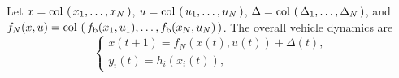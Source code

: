 \documentclass[letterpaper,journal]{IEEEtran}
\def\col#1{\mathop{{\rm col}\,\left(\,#1\,\right)}}
\begin{document}
Let $x=\col{x_1,\ldots,x_N}$, $u=\col{u_1,\ldots,u_N}$, $\Delta=\col{\Delta_1,\ldots,\Delta_N}$, and $f_N(x,u)=\col{f_{\text{b}}(x_1,u_1),\ldots,f_{\text{b}}(x_N,u_N)}$. The overall vehicle dynamics are
\begin{equation}\label{eq_platoon}
\left\{
\begin{array}{l}
      x(t+1)=f_N(x(t),u(t))+\Delta(t),\\
      y_i(t)=h_i(x_i(t)),
\end{array}
\right.
\end{equation}
\end{document}
